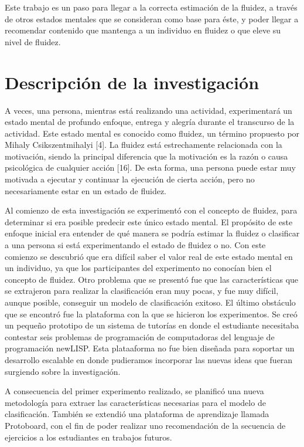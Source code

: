 Este trabajo es un paso para llegar a la correcta estimación de la fluidez, a través de otros estados mentales que se consideran como base para éste, y poder llegar a recomendar contenido que mantenga a un individuo en fluidez o que eleve su nivel de fluidez.

\section{Descripción de la investigación}

A veces, una persona, mientras está realizando una actividad, experimentará un estado mental de profundo enfoque, entrega y alegría durante el transcurso de la actividad. Este estado mental es conocido como fluidez, un término propuesto por Mihaly Csikszentmihalyi [4]. La fluidez está estrechamente relacionada con la motivación, siendo la principal diferencia que la motivación es la razón o causa psicológica de cualquier acción [16]. De esta forma, una persona puede estar muy motivada a ejecutar y continuar la ejecución de cierta acción, pero no necesariamente estar en un estado de fluidez.

Al comienzo de esta investigación se experimentó con el concepto de fluidez, para determinar si era posible predecir este único estado mental. El propósito de este enfoque inicial era entender de qué manera se podría estimar la fluidez o clasificar a una persona si está experimentando el estado de fluidez o no. Con este comienzo se descubrió que era difícil saber el valor real de este estado mental en un individuo, ya que los participantes del experimento no conocían bien el concepto de fluidez. Otro problema que se presentó fue que las características que se extrajeron para realizar la clasificación eran muy pocas, y fue muy difícil, aunque posible, conseguir un modelo de clasificación exitoso. El último obstáculo que se encontró fue la plataforma con la que se hicieron los experimentos. Se creó un pequeño prototipo de un sistema de tutorías en donde el estudiante necesitaba contestar seis problemas de programación de computadoras del lenguaje de programación newLISP. Esta plataaforma no fue bien diseñada para soportar un desarrollo escalable en donde pudieramos incorporar las nuevas ideas que fueran surgiendo sobre la investigación.

A consecuencia del primer experimento realizado, se planificó una nueva metodología para extraer las características necesarias para el modelo de clasificación. También se extendió una plataforma de aprendizaje llamada Protoboard, con el fin de poder realizar uno recomendación de la secuencia de ejercicios a los estudiantes en trabajos futuros.

